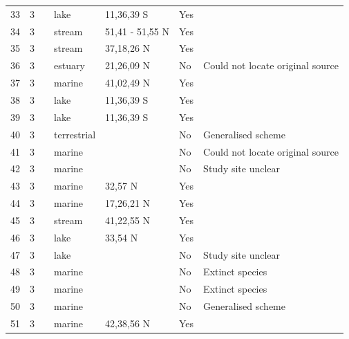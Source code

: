 \documentclass[12pt]{article}
\begin{document}
\begin{landscape}
\begin{table}[h!]
{\begin{tabular}{p{2.8cm}p{1.3cm}p{3cm}p{2.2cm}p{2.5cm}lp{8.2cm}}
        33    & 3 & \cite{Fryer1959} & lake & 11,36,39 S & Yes  &    \\
        34    & 3 & \cite{Jones1949}     & stream & 51,41 - 51,55 N & Yes   &       \\
        35    & 3 & \cite{Minshall1967}    & stream & 37,18,26 N & Yes   &       \\
        36    & 3 & \cite{Walsh1967}  & estuary & 21,26,09 N & No    & Could not locate original source \\
        37    & 3 & \cite{Clarke1967}    & marine & 41,02,49 N & Yes  &     \\
        38    & 3 & \cite{Fryer1959} & lake & 11,36,39 S & Yes &   \\
        39    & 3 & \cite{Fryer1959} & lake & 11,36,39 S & Yes &    \\
        40    & 3 & \cite{Harrison1962}  & terrestrial &       & No    & Generalised scheme \\
        41    & 3 & \cite{Parin1970}  & marine &       & No    & Could not locate original source \\
        42    & 3 & \cite{Vinogradov1978}  & marine &       & No    & Study site unclear \\
        43    & 3 & \cite{Rosenthal1974}    & marine & 32,57 N & Yes   &       \\
        44    & 3 & \cite{Yanez1978}  & marine & 17,26,21 N & Yes   &       \\
        45    & 3 & \cite{Tilly1968}    & stream & 41,22,55 N & Yes   &       \\
        46    & 3 & \cite{Patten1975}    & lake & 33,54 N & Yes   &       \\
        47    & 3 & \cite{Harris1980}    & lake &       & No    & Study site unclear \\
        48    & 3 & \cite{Simenstad1978}    & marine &       & No    & Extinct species \\
        49    & 3 & \cite{Simenstad1978}    & marine &       & No    & Extinct species \\
        50    & 3 & \cite{Nybakken1982}    & marine &       & No    & Generalised scheme \\
        51    & 3 & \cite{Dexter1947}    & marine & 42,38,56 N & Yes   &       \\
      \hline
      \end{tabular}}%
      \end{table}

        \newpage


\end{landscape}
\end{document}
